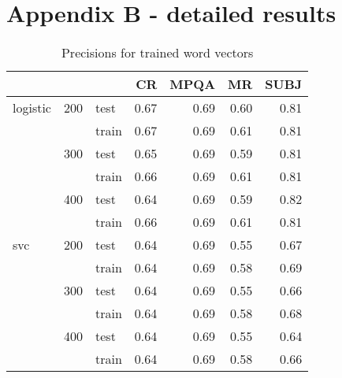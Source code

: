 \chapter{Appendix B - detailed results}
\label{appendix:b}

\begin{table}[h]
\begin{center}

\begin{tabular}{lllrrrr}
\toprule
 & &&CR &MPQA &MR &SUBJ \\
\midrule
logistic & 200 & test & 0.67 & 0.69 & 0.60 & 0.81 \\
 & & train & 0.67 & 0.69 & 0.61 & 0.81 \\
 & 300 & test & 0.65 & 0.69 & 0.59 & 0.81 \\
 & & train & 0.66 & 0.69 & 0.61 & 0.81 \\
 & 400 & test & 0.64 & 0.69 & 0.59 & 0.82 \\
 & & train & 0.66 & 0.69 & 0.61 & 0.81 \\
svc & 200 & test & 0.64 & 0.69 & 0.55 & 0.67 \\
 & & train & 0.64 & 0.69 & 0.58 & 0.69 \\
 & 300 & test & 0.64 & 0.69 & 0.55 & 0.66 \\
 & & train & 0.64 & 0.69 & 0.58 & 0.68 \\
 & 400 & test & 0.64 & 0.69 & 0.55 & 0.64 \\
 & & train & 0.64 & 0.69 & 0.58 & 0.66 \\
\bottomrule
\end{tabular}           
\caption[Precisions for trained word vectors]{Precisions for trained word vectors}
\label{tab:res:trainedwordvec}
\end{center}
\end{table}



